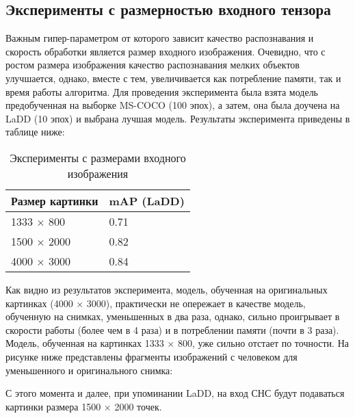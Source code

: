 \subsection{Эксперименты с размерностью входного тензора}

Важным гипер-параметром от которого зависит качество распознавания и скорость обработки является размер входного изображения. Очевидно, что с ростом размера изображения качество распознавания мелких объектов улучшается, однако, вместе с тем, увеличивается как потребление памяти, так и время работы алгоритма. Для проведения эксперимента была взята модель предобученная на выборке MS-COCO (100 эпох), а затем, она была доучена на LaDD (10 эпох) и выбрана лучшая модель. Результаты эксперимента приведены в таблице ниже:

\begin{table}[H]
    \caption{Эксперименты с размерами входного изображения}\label{image-size-table}
    \begin{tabular}{|p{7cm}|p{5cm}|}
        \hline
        {Размер картинки} & {mAP (LaDD)} \\
        \hline
        1333 $\times$ 800 & 0.71 \\
        \hline
        1500 $\times$ 2000 & 0.82 \\
        \hline
        4000 $\times$ 3000 & 0.84 \\
        \hline
    \end{tabular}
\end{table}

Как видно из результатов эксперимента, модель, обученная на оригинальных картинках (4000 $\times$ 3000), практически не опережает в качестве модель, обученную на снимках, уменьшенных в два раза, однако, сильно проигрывает в скорости работы (более чем в 4 раза) и в потреблении памяти (почти в 3 раза). Модель, обученная на картинках 1333 $\times$ 800, уже сильно отстает по точности. На рисунке ниже представлены фрагменты изображений с человеком для уменьшенного и оригинального снимка:


С этого момента и далее, при упоминании LaDD, на вход СНС будут подаваться картинки размера 1500 $\times$ 2000 точек.